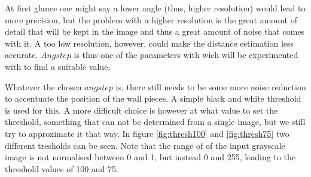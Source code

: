\documentclass[a4paper, 20pt]{article}
\begin{document}
\begin{figure}[!ht]
\centering
\begin{floatrow}
  
\end{floatrow}
\end{figure}

At first glance one might say a lower angle (thus, higher resolution) would lead
to more precision, but the problem with a higher resolution is the great amount of
detail that will be kept in the image and thus a great amount of noise that
comes with it. A too low resolution, however, could make the distance
estimation less accurate. $Angstep$ is thus one of the parameters with
wich will be experimented with to find a suitable value.

Whatever the chosen $angstep$ is, there still needs to be some more noise
reduction to accentuate the position of the wall pieces. A simple black and
white threshold is used for this. A more difficult choice is however at what
value to set the threshold, something that can not be determined from a single
image, but we still try to approximate it that way. In figure \ref{fig:thresh100} and
\ref{fig:thresh75} two different tresholds can be seen. Note that the range of
of the input grayscale image is not normalised between 0 and 1, but instead 0
and 255, leading to the threshold values of 100 and 75.
\end{document}
